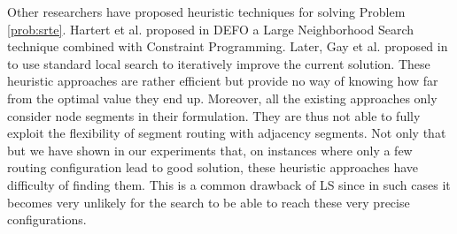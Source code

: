 Other researchers have proposed heuristic techniques for solving Problem \ref{prob:srte}. Hartert et al. proposed in DEFO \cite{defo,hartert2015solving} a Large
Neighborhood Search technique combined with Constraint Programming. Later, Gay et al. proposed in \cite{steven} to use standard local search to iteratively improve the current solution. 
These heuristic approaches are rather efficient but provide no way of knowing how far from the optimal value they end up.
Moreover, all the existing approaches only consider node segments in their formulation. They are thus not able to fully exploit the flexibility of segment routing with adjacency segments.
Not only that but we have shown in our experiments that, on instances where only a few routing configuration lead to good solution, these heuristic approaches have difficulty of finding them. 
This is a common drawback of LS since in such cases it becomes very unlikely for the search to be able to reach these very precise configurations.
